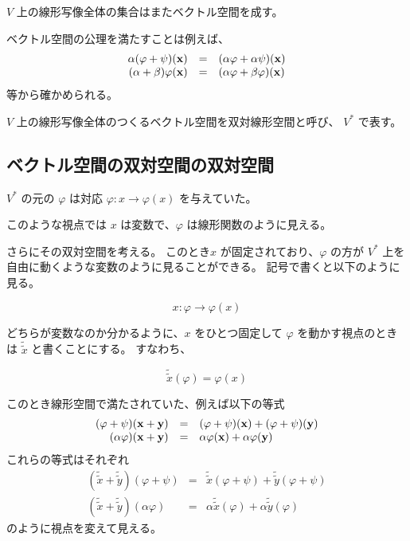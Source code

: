 \documentclass[uplatex,a4j,12pt,dvipdfmx]{jsarticle}
\begin{document}
$V$ 上の線形写像全体の集合はまたベクトル空間を成す。

ベクトル空間の公理を満たすことは例えば、
\[
	\begin{array}{rcl}
		\alpha (\varphi + \psi) (\bf{x} ) & = & ( \alpha \varphi + \alpha \psi) (\bf{x} )
		\\
		(\alpha + \beta) \varphi (\bf{x}) & = & (\alpha \varphi + \beta \varphi) (\bf{x})
	\end{array}
\]
等から確かめられる。

$V$ 上の線形写像全体のつくるベクトル空間を双対線形空間と呼び、 $V^{*}$ で表す。

\subsection{ベクトル空間の双対空間の双対空間}

$V^{*}$ の元の $\varphi$ は対応 $\varphi : x \to \varphi(x)$ を与えていた。

このような視点では $x$ は変数で、$\varphi$ は線形関数のように見える。

さらにその双対空間を考える。
このとき$x$ が固定されており、$\varphi$ の方が $V^{*}$ 上を自由に動くような変数のように見ることができる。
記号で書くと以下のように見る。

$$
	x : \varphi \to \varphi(x)
$$

どちらが変数なのか分かるように、$x$ をひとつ固定して $\varphi$ を動かす視点のときは $\tilde{\tilde{x}}$ と書くことにする。
すなわち、

$$
	\tilde{\tilde{x}}(\varphi) = \varphi(x)
$$

このとき線形空間で満たされていた、例えば以下の等式
\[
	\begin{array}{rcl}
		(\varphi + \psi) (\bf{x} + \bf{y})
		 & = &
		(\varphi + \psi) (\bf{x}) + (\varphi + \psi) (\bf{y})
		\\
		(\alpha \varphi) (\bf{x} + \bf{y})
		 & = &
		\alpha \varphi (\bf{x}) + \alpha \varphi (\bf{y})
	\end{array}
\]
これらの等式はそれぞれ
\[
	\begin{array}{rcl}
		(\tilde{\tilde{x}} + \tilde{\tilde{y}} ) (\varphi + \psi)
		 & = &
		\tilde{\tilde{x}} (\varphi + \psi)  + \tilde{\tilde{y}} (\varphi + \psi)
		\\
		(\tilde{\tilde{x}} + \tilde{\tilde{y}} ) (\alpha \varphi)
		 & = &
		\alpha \tilde{\tilde{x}} (\varphi) + \alpha \tilde{\tilde{y}} (\varphi)
	\end{array}
\]
のように視点を変えて見える。
\end{document}
